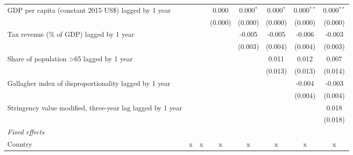 \begin{tabular}{lccccccc}
   GDP per capita (constant 2015 US\$) lagged by 1 year                                   &              &              & 0.000        & 0.000$^{*}$ & 0.000$^{*}$ & 0.000$^{**}$ & 0.000$^{**}$\\   
                                                                                          &              &              & (0.000)      & (0.000)     & (0.000)     & (0.000)      & (0.000)\\   
   Tax revenue (\% of GDP) lagged by 1 year                                               &              &              &              & -0.005      & -0.005      & -0.006       & -0.003\\   
                                                                                          &              &              &              & (0.003)     & (0.004)     & (0.004)      & (0.003)\\   
   Share of population >65 lagged by 1 year                                               &              &              &              &             & 0.011       & 0.012        & 0.007\\   
                                                                                          &              &              &              &             & (0.013)     & (0.013)      & (0.014)\\   
   Gallagher index of disproportionality lagged by 1 year                                 &              &              &              &             &             & -0.004       & -0.003\\   
                                                                                          &              &              &              &             &             & (0.004)      & (0.004)\\   
   Stringency value modified, three-year lag lagged by 1 year                             &              &              &              &             &             &              & 0.018\\   
                                                                                          &              &              &              &             &             &              & (0.018)\\   
   \emph{Fixed effects}\\
   Country                                                                                & x            & x            & x            & x           & x           & x            & x\\  

\end{tabular}
